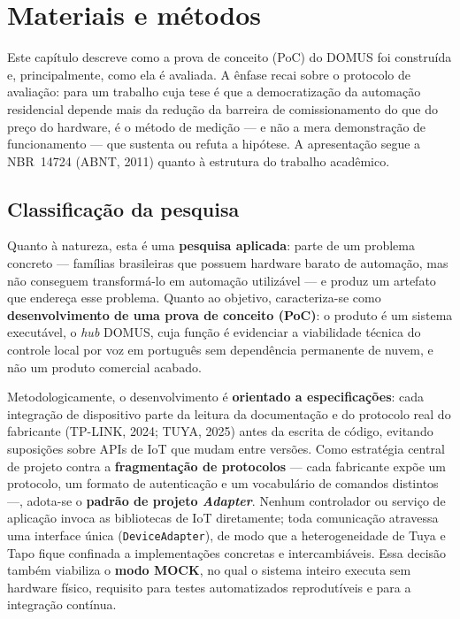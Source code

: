 \section{Materiais e métodos}\label{cap:metodos}

Este capítulo descreve como a prova de conceito (PoC) do DOMUS foi construída e,
principalmente, como ela é avaliada. A ênfase recai sobre o protocolo de avaliação:
para um trabalho cuja tese é que a democratização da automação residencial depende
mais da redução da barreira de comissionamento do que do preço do hardware, é o
método de medição --- e não a mera demonstração de funcionamento --- que sustenta ou
refuta a hipótese. A apresentação segue a NBR~14724 (ABNT, 2011) quanto à estrutura
do trabalho acadêmico.

\subsection{Classificação da pesquisa}\label{sec:classificacao}

Quanto à natureza, esta é uma \textbf{pesquisa aplicada}: parte de um problema concreto
--- famílias brasileiras que possuem hardware barato de automação, mas não conseguem
transformá-lo em automação utilizável --- e produz um artefato que endereça esse
problema. Quanto ao objetivo, caracteriza-se como \textbf{desenvolvimento de uma prova
de conceito (PoC)}: o produto é um sistema executável, o \textit{hub} DOMUS, cuja função
é evidenciar a viabilidade técnica do controle local por voz em português sem
dependência permanente de nuvem, e não um produto comercial acabado.

Metodologicamente, o desenvolvimento é \textbf{orientado a especificações}: cada
integração de dispositivo parte da leitura da documentação e do protocolo real do
fabricante (TP-LINK, 2024; TUYA, 2025) antes da escrita de código, evitando suposições
sobre APIs de IoT que mudam entre versões. Como estratégia central de projeto contra a
\textbf{fragmentação de protocolos} --- cada fabricante expõe um protocolo, um formato de
autenticação e um vocabulário de comandos distintos ---, adota-se o \textbf{padrão de
projeto \textit{Adapter}}. Nenhum controlador ou serviço de aplicação invoca as
bibliotecas de IoT diretamente; toda comunicação atravessa uma interface única
(\texttt{DeviceAdapter}), de modo que a heterogeneidade de Tuya e Tapo fique confinada a
implementações concretas e intercambiáveis. Essa decisão também viabiliza o \textbf{modo
MOCK}, no qual o sistema inteiro executa sem hardware físico, requisito para testes
automatizados reprodutíveis e para a integração contínua.

